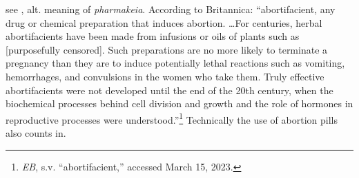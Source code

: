 \item[Abortifacient,]

see , alt. meaning of \emph{pharmakeia}.
According to Britannica: ``abortifacient, any drug or chemical preparation that induces abortion. \ldots For centuries, herbal abortifacients have been made from infusions or oils of plants such as [purposefully censored]. Such preparations are no more likely to terminate a pregnancy than they are to induce potentially lethal reactions such as vomiting, hemorrhages, and convulsions in the women who take them. Truly effective abortifacients were not developed until the end of the 20th century, when the biochemical processes behind cell division and growth and the role of hormones in reproductive processes were understood.''\footnote{\emph{EB}, s.v. ``abortifacient,'' accessed March 15, 2023.} Technically the use of abortion pills also counts in.

